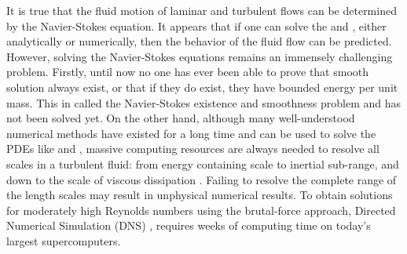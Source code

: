 It is true that the fluid motion of laminar and turbulent flows can be determined by the Navier-Stokes equation. It appears that if one can solve the  and , either analytically or numerically, then the behavior of the fluid flow can be predicted. However, solving the Navier-Stokes equations remains an immensely challenging problem. Firstly, until now no one has ever been able to prove that smooth solution always exist, or that if they do exist, they have bounded energy per unit mass. This in called the Navier-Stokes existence and smoothness problem \cite{ladyzhenskaya1969mathematical} and has not been solved yet. On the other hand, although many well-understood numerical methods have existed for a long time and can be used to solve the PDEs like  and , massive computing resources are always needed to resolve all scales in a turbulent fluid: from energy containing scale to inertial sub-range, and down to the scale of viscous dissipation \cite{PopeTurbulent2000}. Failing to resolve the complete range of the length scales may result in unphysical numerical results. To obtain solutions for moderately high Reynolds numbers using the brutal-force approach, Directed Numerical Simulation (DNS) \cite{PopeTurbulent2000}, requires weeks of computing time on today's largest supercomputers. 

